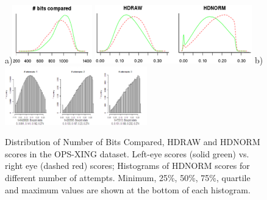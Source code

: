 \documentclass{cta-author}%
\begin{document}
\begin{figure}[!t]

a)\includegraphics[width=0.15\linewidth,height=1in]{eps/bits-comp.eps}%
\includegraphics[width=0.335\linewidth,height=1in]{eps/HDnorm-vs-HDraw.eps} \quad 
b)\includegraphics[width=0.5\linewidth,height=1in]{eps/HD=f(attempts)-c.eps} 

\caption{Distribution of  Number of Bits Compared, HDRAW and HDNORM scores in the OPS-XING dataset. 
 {  Left-eye scores (solid green) vs.   right eye (dashed red) scores; }
 {Histograms of HDNORM scores for different number of attempts. 
Minimum, 25\%, 50\%,  75\%, quartile and maximum values are shown at the bottom of each histogram.}
\label{fHDhisto}}
\end{figure}
\end{document}
